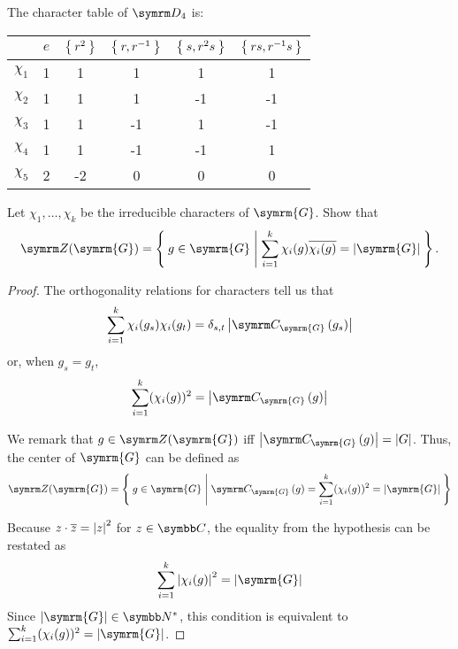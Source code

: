 \begin{solution}
The character table of \(\dihedralgroup{4}\) is:
\begin{center}
    \begin{tabular}{c|c|c|c|c|c}
        & \(e\) & \(\Set{r^2}\) & \(\Set{r, r^{-1}}\) & \(\Set{s, r^2 s}\) & \(\Set{rs, r^{-1} s}\) \\
        \hline
        \(\chi_1\) & 1 & 1 & 1 & 1 & 1 \\
        \hline
        \(\chi_2\) & 1 & 1 & 1 & -1 & -1 \\
        \hline
        \(\chi_3\) & 1 & 1 & -1 & 1 & -1 \\
        \hline
        \(\chi_4\) & 1 & 1 & -1 & -1 & 1 \\
        \hline
        \(\chi_5\) & 2 & -2 & 0 & 0 & 0
    \end{tabular}
\end{center}
\end{solution}

\begin{exercise}
Let \(\chi_1, \dots, \chi_k\) be the irreducible characters of \(\symrm{G}\). Show that
\[
    \centerofgroup(\symrm{G}) = \Set{ g \in \symrm{G} | \sum_{i = 1}^{k} \chi_i (g) \overline{\chi_i (g)} = \abs{\symrm{G}} }.
\]
\end{exercise}
\begin{proof}
The orthogonality relations for characters tell us that
\[
    \sum_{i = 1}^{k} \chi_i (g_s) \chi_i (g_t) = \delta_{s, t} \abs{\centralizer{\symrm{G}}{g_s}}
\]
or, when \(g_s = g_t\),
\[
    \sum_{i = 1}^{k} (\chi_i (g))^2 = \abs{\centralizer{\symrm{G}}{g}}
\]
\vspace{4pt}

We remark that \(g \in \centerofgroup(\symrm{G})\) iff \(\abs{\centralizer{\symrm{G}}{g}} = \abs{G}\). Thus, the center of \(\symrm{G}\) can be defined as
\[
    \centerofgroup(\symrm{G}) = \Set{ g \in \symrm{G} | \centralizer{\symrm{G}}{g} = \sum_{i = 1}^{k} (\chi_i (g))^2 = \abs{\symrm{G}} }
\]

Because \(z \cdot \overline{z} = \left|z\right|^2\) for \(z \in \complex\), the equality from the hypothesis can be restated as
\[
    \sum_{i = 1}^{k} \abs{\chi_i(g)}^2 = \abs{\symrm{G}}
\]
Since \(\abs{\symrm{G}} \in \naturals^*\), this condition is equivalent to \(\sum_{i = 1}^{k} (\chi_i (g))^2 = \abs{\symrm{G}}\).
\end{proof}

